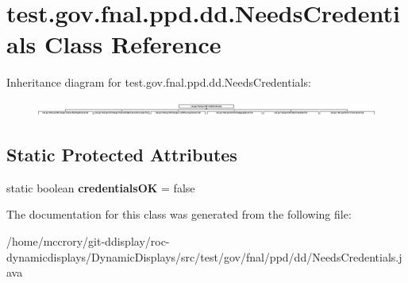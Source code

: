 \hypertarget{classtest_1_1gov_1_1fnal_1_1ppd_1_1dd_1_1NeedsCredentials}{\section{test.\-gov.\-fnal.\-ppd.\-dd.\-Needs\-Credentials Class Reference}
\label{classtest_1_1gov_1_1fnal_1_1ppd_1_1dd_1_1NeedsCredentials}
}
Inheritance diagram for test.\-gov.\-fnal.\-ppd.\-dd.\-Needs\-Credentials\-:\begin{figure}[H]
\begin{center}
\leavevmode
\includegraphics[height=0.478632cm]{classtest_1_1gov_1_1fnal_1_1ppd_1_1dd_1_1NeedsCredentials}
\end{center}
\end{figure}
\subsection*{Static Protected Attributes}
\begin{DoxyCompactItemize}
\item 
\hypertarget{classtest_1_1gov_1_1fnal_1_1ppd_1_1dd_1_1NeedsCredentials_a2db70b93bc3c6d68e11319152311d616}{static boolean {\bfseries credentials\-O\-K} = false}\label{classtest_1_1gov_1_1fnal_1_1ppd_1_1dd_1_1NeedsCredentials_a2db70b93bc3c6d68e11319152311d616}

\end{DoxyCompactItemize}


The documentation for this class was generated from the following file\-:\begin{DoxyCompactItemize}
\item 
/home/mccrory/git-\/ddisplay/roc-\/dynamicdisplays/\-Dynamic\-Displays/src/test/gov/fnal/ppd/dd/Needs\-Credentials.\-java\end{DoxyCompactItemize}
